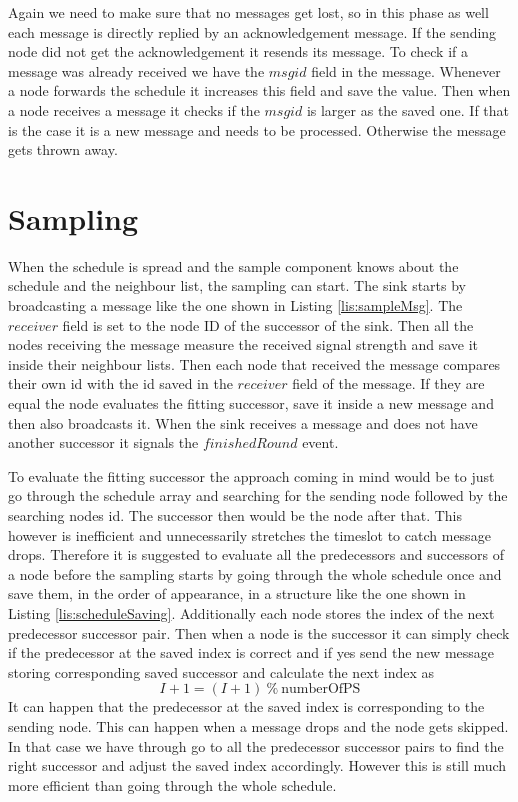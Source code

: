 Again we need to make sure that no messages get lost, so in this phase as well each message is directly replied by an acknowledgement message. If the sending node did not get the acknowledgement it resends its message. To check if a message was already received we have the $msgid$ field in the message. Whenever a node forwards the schedule it increases this field and save the value. Then when a node receives a message it checks if the $msgid$ is larger as the saved one. If that is the case it is a new message and needs to be processed. Otherwise the message gets thrown away. 
\section{Sampling}
When the schedule is spread and the sample component knows about the schedule and the neighbour list, the sampling can start. The sink starts by broadcasting a  message like the one shown in Listing \ref{lis:sampleMsg}. The $receiver$ field is set to the node ID of the successor of the sink. Then all the nodes receiving the message measure the received signal strength and save it inside their neighbour lists. Then each node that received the message compares their own id with the id saved in the $receiver$ field of the message. If they are equal the node evaluates the fitting successor, save it inside a new message and then also broadcasts it. When the sink receives a message and does not have another successor it signals the $finishedRound$ event.

To evaluate the fitting successor the approach coming in mind would be to just go through the schedule array and searching for the sending node followed by the searching nodes id. The successor then would be the node after that. This however is inefficient and unnecessarily stretches the timeslot to catch message drops. Therefore it is suggested to evaluate all the predecessors and successors of a node before the sampling starts by going through the whole schedule once and save them, in the order of appearance, in a structure like the one shown in Listing \ref{lis:scheduleSaving}. Additionally each node stores the index of the next predecessor successor pair. Then when a node is the successor it can simply check if the predecessor at the saved index is correct and if yes send the new message storing corresponding saved successor and calculate the next index as
\[ I+1 = (I + 1)\ \%\ \mbox{numberOfPS}\]      
It can happen that the predecessor at the saved index is corresponding to the sending node. This can happen when a message drops and the node gets skipped.
In that case we have through go to all the predecessor successor pairs to find the right successor and adjust the saved index accordingly. However this is still much more efficient than going through the whole schedule.

